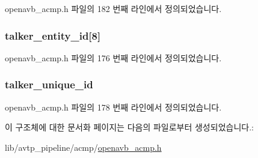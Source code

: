 openavb\+\_\+acmp.\+h 파일의 182 번째 라인에서 정의되었습니다.

\subsubsection[{\texorpdfstring{talker\+\_\+entity\+\_\+id}{talker_entity_id}}]{ talker\+\_\+entity\+\_\+id\mbox{[}8\mbox{]}}\hypertarget{structopenavb__acmp___a_c_m_p_command_params__t_a9a599b9c25c2171c3e76f269d9a04f51}{}\label{structopenavb__acmp___a_c_m_p_command_params__t_a9a599b9c25c2171c3e76f269d9a04f51}


openavb\+\_\+acmp.\+h 파일의 176 번째 라인에서 정의되었습니다.

\subsubsection[{\texorpdfstring{talker\+\_\+unique\+\_\+id}{talker_unique_id}}]{ talker\+\_\+unique\+\_\+id}\hypertarget{structopenavb__acmp___a_c_m_p_command_params__t_a545e994bde6218210bb41265ac298837}{}\label{structopenavb__acmp___a_c_m_p_command_params__t_a545e994bde6218210bb41265ac298837}


openavb\+\_\+acmp.\+h 파일의 178 번째 라인에서 정의되었습니다.



이 구조체에 대한 문서화 페이지는 다음의 파일로부터 생성되었습니다.\+:\begin{DoxyCompactItemize}
\item 
lib/avtp\+\_\+pipeline/acmp/\hyperlink{openavb__acmp_8h}{openavb\+\_\+acmp.\+h}\end{DoxyCompactItemize}
